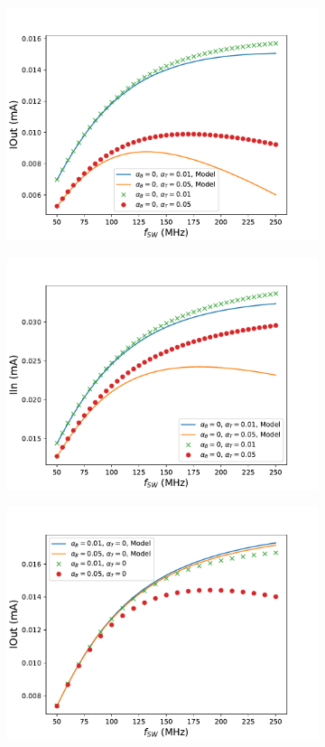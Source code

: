 \begin{figure}
\begin{subfigure}{0.48\linewidth}
			\includegraphics[width=\linewidth]{4Terminal/Figures/IOUT_2.pdf}
		\end{subfigure}
		\begin{subfigure}{0.48\linewidth}
			\includegraphics[width=\linewidth]{4Terminal/Figures/IIN_2.pdf}
		\end{subfigure}
		\begin{subfigure}{0.48\linewidth}
			\includegraphics[width=\linewidth]{4Terminal/Figures/IOUT_3.pdf}

\end{subfigure}
\end{figure}
